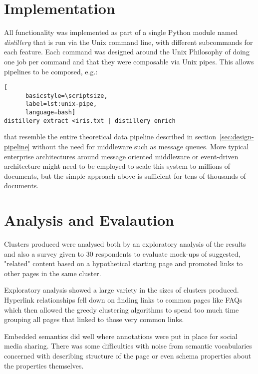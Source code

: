 \documentclass{sig-alternate-05-2015}
\begin{document}
\section{Implementation}

All functionality was implemented as part of a single Python module
named \emph{distillery}
that is run via the Unix command line, with different subcommands for
each feature. Each command was designed around the
Unix Philosophy\cite{raymond2003art} of doing one job per command and
that they were composable via Unix pipes. This allows pipelines to
be composed, e.g.:

\begin{centering}
  \begin{lstlisting}[
      basicstyle=\scriptsize,
      label=lst:unix-pipe,
      language=bash]
distillery extract <iris.txt | distillery enrich
  \end{lstlisting}
\end{centering}

\noindent that resemble the entire theoretical data pipeline described
in section~\ref{sec:design-pipeline} without the need for middleware
such as message queues. More typical enterprise architectures around
message oriented middleware or event-driven architecture might need
to be employed to scale this system to millions of documents, but
the simple approach above is sufficient for tens of thousands of
documents.

\section{Analysis and Evalaution}

Clusters produced were analysed both by an exploratory analysis of the results
and also a survey given to 30 respondents to evaluate mock-ups of
suggested, "related" content based on a hypothetical starting page and
promoted links to other pages in the same cluster.

Exploratory analysis showed a large variety in the sizes of clusters produced.
Hyperlink relationships fell down on finding links to common pages like FAQs
which then allowed the greedy clustering algorithms to spend too much time
grouping all pages that linked to those very common links.

Embedded semantics did well where annotations were put in place for social
media sharing. There was some difficulties with noise from semantic vocabularies
concerned with describing structure of the page or even schema properties
about the properties themselves.
\end{document}
